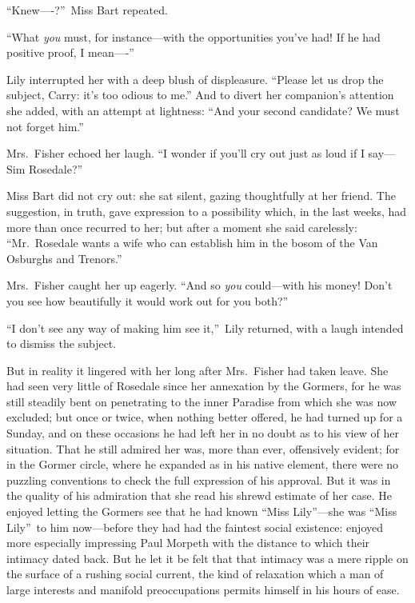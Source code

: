 \documentclass[12pt,a4paper]{book}
\begin{document}
``Knew----?''\ Miss Bart repeated.





``What \textit{you} must, for instance---with the opportunities you've had! 
If he had positive proof, I mean----''





Lily interrupted her with a deep blush of displeasure. ``Please
let us drop the subject, Carry: it's too odious to me.'' And to
divert her companion's attention she added, with an attempt at
lightness: ``And your second candidate? We must not forget him.''





Mrs.\ Fisher echoed her laugh. ``I wonder if you'll cry out just as
loud if I say---Sim Rosedale?''





Miss Bart did not cry out: she sat silent, gazing thoughtfully at
her friend. The suggestion, in truth, gave expression to a
possibility which, in the last weeks, had more than once recurred
to her; but after a moment she said carelessly: ``Mr.\ Rosedale
wants a wife who can establish him in the bosom of the Van
Osburghs and Trenors.''





Mrs.\ Fisher caught her up eagerly. ``And so \textit{you} could---with his
money! Don't you see how beautifully it would work out for you
both?''





``I don't see any way of making him see it,''\ Lily returned, with a
laugh intended to dismiss the subject.





But in reality it lingered with her long after Mrs.\ Fisher had
taken leave. She had seen very little of Rosedale since her
annexation by the Gormers, for he was still steadily bent on
penetrating to the inner Paradise from which she was now
excluded; but once or twice, when nothing better offered, he had
turned up for a Sunday, and on these occasions he had left her in
no doubt as to his view of her situation. That he still
admired her was, more than ever, offensively evident; for in the
Gormer circle, where he expanded as in his native element, there
were no puzzling conventions to check the full expression of his
approval. But it was in the quality of his admiration that she
read his shrewd estimate of her case. He enjoyed letting the
Gormers see that he had known ``Miss Lily''---she was ``Miss Lily''\ to
him now---before they had had the faintest social existence: 
enjoyed more especially impressing Paul Morpeth with the distance
to which their intimacy dated back. But he let it be felt that
that intimacy was a mere ripple on the surface of a rushing
social current, the kind of relaxation which a man of large
interests and manifold preoccupations permits himself in his
hours of ease.
\end{document}
